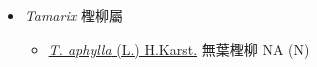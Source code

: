 
  \begin{itemize}
 \item[] \textit{Tamarix} 檉柳屬
                                
  \begin{itemize}
        \item[] \href{http://www.theplantlist.org/tpl1.1/search?q=Tamarix+aphylla}{\textit{T. aphylla} (L.) H.Karst.}   無葉檉柳   NA (N)
  \end{itemize}
  \end{itemize}
